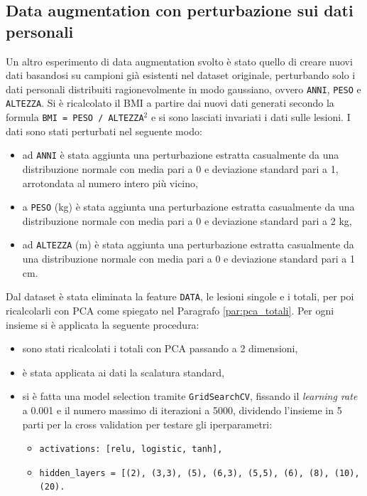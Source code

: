 \documentclass[12pt, twoside, letterpaper]{report}
\begin{document}
		\subsection{Data augmentation con perturbazione sui dati personali} \label{sec:data_aug_pers}
			Un altro esperimento di data augmentation svolto è stato quello di creare nuovi dati basandosi su campioni già esistenti nel dataset originale, perturbando solo i dati personali distribuiti ragionevolmente in modo gaussiano, ovvero \texttt{ANNI}, \texttt{PESO} e \texttt{ALTEZZA}. Si è ricalcolato il BMI a partire dai nuovi dati generati secondo la formula \texttt{BMI = PESO / ALTEZZA$^2$} e si sono lasciati invariati i dati sulle lesioni. I dati sono stati perturbati nel seguente modo: 
			\begin{itemize}
			\item ad \texttt{ANNI} è stata aggiunta una perturbazione estratta casualmente da una distribuzione normale con media pari a 0 e deviazione standard pari a 1, arrotondata al numero intero più vicino,
			\item a \texttt{PESO} (kg) è stata aggiunta una perturbazione estratta casualmente da una distribuzione normale con media pari a 0 e deviazione standard pari a 2 kg,
			\item ad \texttt{ALTEZZA} (m) è stata aggiunta una perturbazione estratta casualmente da una distribuzione normale con media pari a 0 e deviazione standard pari a 1 cm.
			\end{itemize}
			Dal dataset è stata eliminata la feature \texttt{DATA}, le lesioni singole e i totali, per poi ricalcolarli con PCA come spiegato nel Paragrafo \ref{par:pca_totali}. Per ogni insieme si è applicata la seguente procedura:
				\begin{itemize}
				\item sono stati ricalcolati i totali con PCA passando a 2 dimensioni,
				\item è stata applicata ai dati la scalatura standard,
				\item si è fatta una model selection tramite \texttt{GridSearchCV}, fissando il \textit{learning rate} a 0.001 e il numero massimo di iterazioni a 5000, dividendo l'insieme in 5 parti per la cross validation per testare gli iperparametri:
				 	\begin{itemize}
					\item \texttt{activations: [relu, logistic, tanh],}
    				\item \texttt{hidden\_layers = [(2), (3,3), (5), (6,3), (5,5), (6), (8), (10), \\    				
    				(20).}
					\end{itemize}
				 \end{itemize}
\end{document}
